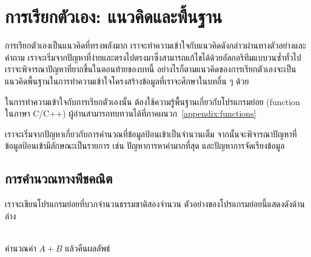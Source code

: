 \chapter{การ{\wbr}เรียก{\wbr}ตัวเอง: แนว{\wbr}คิด{\wbr}และ{\wbr}พื้นฐาน}

การ{\wbr}เรียก{\wbr}ตัวเอง{\wbr}เป็น{\wbr}แนว{\wbr}คิด{\wbr}ที่{\wbr}ทรง{\wbr}พลัง{\wbr}มาก{\wbr}
เรา{\wbr}จะ{\wbr}ทำ{\wbr}ความ{\wbr}เข้าใจ{\wbr}กับ{\wbr}แนว{\wbr}คิด{\wbr}ดังกล่าว{\wbr}ผ่าน{\wbr}ทาง{\wbr}ตัวอย่าง{\wbr}และ{\wbr}คำถาม{\wbr}
เรา{\wbr}จะ{\wbr}เริ่ม{\wbr}จาก{\wbr}ปัญหา{\wbr}ที่{\wbr}ง่าย{\wbr}และ{\wbr}ตรงไปตรงมา{\wbr}ซึ่ง{\wbr}สามารถ{\wbr}แก้ไข{\wbr}ได้{\wbr}ด้วย{\wbr}อัล{\wbr}กอ{\wbr}ริ{\wbr}ทึม{\wbr}แบบ{\wbr}วน{\wbr}ซ้ำ{\wbr}ทั่วไป{\wbr}
เรา{\wbr}จะ{\wbr}พิจารณา{\wbr}ปัญหา{\wbr}ที่{\wbr}ยาก{\wbr}ขึ้น{\wbr}ใน{\wbr}ตอน{\wbr}ท้าย{\wbr}ของ{\wbr}บท{\wbr}นี้{\wbr}
อย่างไรก็ตาม{\wbr}แนว{\wbr}คิด{\wbr}ของ{\wbr}การ{\wbr}เรียก{\wbr}ตัวเอง{\wbr}จะ{\wbr}เป็น{\wbr}แนว{\wbr}คิด{\wbr}พื้นฐาน{\wbr}ใน{\wbr}การ{\wbr}ทำ{\wbr}ความ{\wbr}เข้าใจ{\wbr}โครงสร้าง{\wbr}ข้อมูล{\wbr}ที่{\wbr}เรา{\wbr}จะ{\wbr}ศึกษา{\wbr}ใน{\wbr}บท{\wbr}อื่น ๆ ด้วย{\wbr}

ใน{\wbr}การ{\wbr}ทำ{\wbr}ความ{\wbr}เข้าใจ{\wbr}กับ{\wbr}การ{\wbr}เรียก{\wbr}ตัวเอง{\wbr}นั้น ต้อง{\wbr}ใช้{\wbr}ความ{\wbr}รู้{\wbr}พื้นฐาน{\wbr}เกี่ยวกับ{\wbr}โปรแกรมย่อย{\wbr}
(function ใน{\wbr}ภาษา C/C++)
ผู้อ่าน{\wbr}สามารถ{\wbr}ทบทวน{\wbr}ได้{\wbr}ที่{\wbr}ภาคผนวก~\ref{appendix:functions}

เรา{\wbr}จะ{\wbr}เริ่ม{\wbr}จาก{\wbr}ปัญหา{\wbr}เกี่ยวกับ{\wbr}การ{\wbr}คำนวณ{\wbr}ที่{\wbr}ข้อมูล{\wbr}ป้อน{\wbr}เข้า{\wbr}เป็น{\wbr}จำนวนเต็ม{\wbr}
จากนั้น{\wbr}จะ{\wbr}พิจารณา{\wbr}ปัญหา{\wbr}ที่{\wbr}ข้อมูล{\wbr}ป้อน{\wbr}เข้า{\wbr}มี{\wbr}ลักษณะ{\wbr}เป็น{\wbr}รายการ เช่น ปัญหา{\wbr}การ{\wbr}หา{\wbr}ค่า{\wbr}มาก{\wbr}ที่สุด{\wbr}
และ{\wbr}ปัญหา{\wbr}การ{\wbr}จัดเรียง{\wbr}ข้อมูล 

\section{การ{\wbr}คำนวณ{\wbr}ทาง{\wbr}พีชคณิต}

เรา{\wbr}จะ{\wbr}เขียน{\wbr}โปรแกรมย่อย{\wbr}ที่{\wbr}บวก{\wbr}จำนวน{\wbr}ธรรมชาติ{\wbr}สอง{\wbr}จำนวน ตัวอย่าง{\wbr}ของ{\wbr}โปรแกรมย่อย{\wbr}นี้{\wbr}แสดง{\wbr}ดัง{\wbr}ด้าน{\wbr}ล่าง{\wbr}

\begin{algt}
\\
\hspace*{0.2in} คำนวณ{\wbr}ค่า $A+B$ แล้ว{\wbr}คืน{\wbr}ผลลัพธ์{\wbr}
\end{algt}

